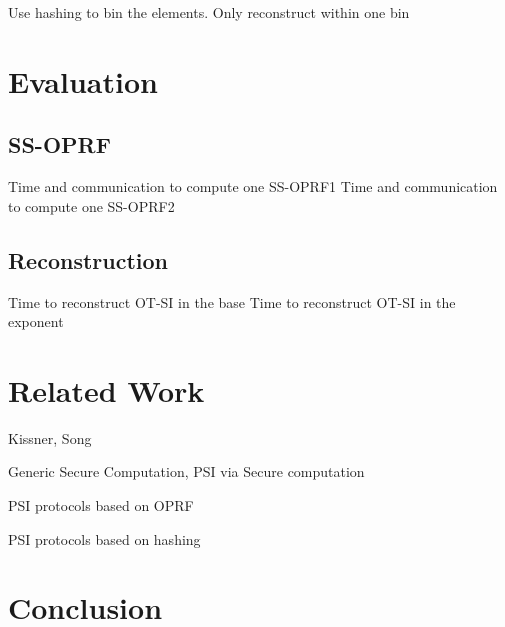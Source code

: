\documentclass[10pt, sigconf]{acmart}
\begin{document}
Use hashing to bin the elements.  Only reconstruct within one bin

\section{Evaluation}

\subsection{SS-OPRF}

Time and communication to compute one SS-OPRF1
Time and communication to compute one SS-OPRF2

\subsection{Reconstruction}

Time to reconstruct OT-SI in the base
Time to reconstruct OT-SI in the exponent

\section{Related Work}

Kissner, Song

Generic Secure Computation, PSI via Secure computation

PSI protocols based on OPRF

PSI protocols based on hashing

\section{Conclusion}



\end{document}
